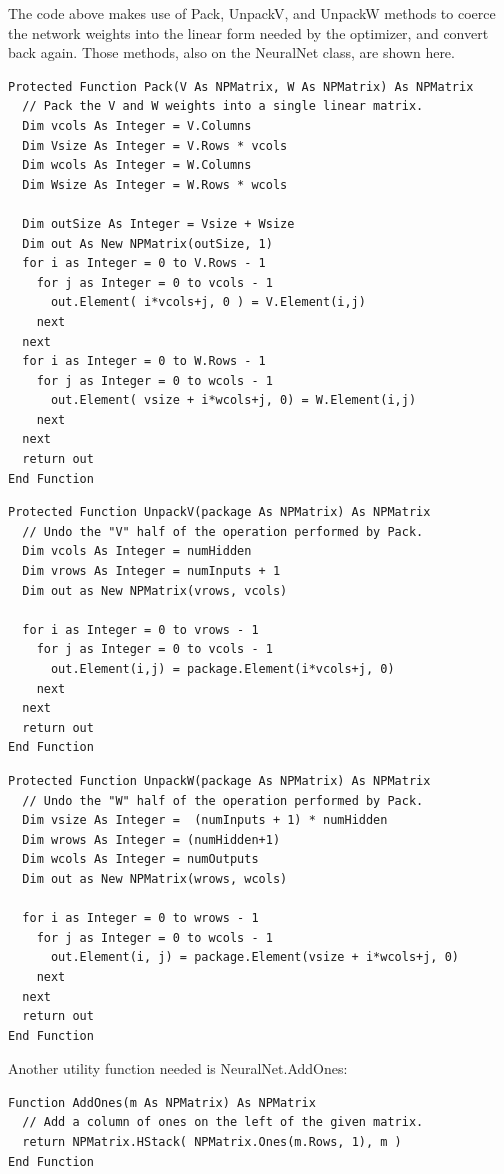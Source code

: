 \documentclass{article}
\begin{document}
The code above makes use of Pack, UnpackV, and UnpackW methods to coerce the network weights into the linear form needed by the optimizer, and convert back again.  Those methods, also on the NeuralNet class, are shown here.

\begin{lstlisting}
Protected Function Pack(V As NPMatrix, W As NPMatrix) As NPMatrix
  // Pack the V and W weights into a single linear matrix.
  Dim vcols As Integer = V.Columns
  Dim Vsize As Integer = V.Rows * vcols
  Dim wcols As Integer = W.Columns
  Dim Wsize As Integer = W.Rows * wcols
  
  Dim outSize As Integer = Vsize + Wsize
  Dim out As New NPMatrix(outSize, 1)
  for i as Integer = 0 to V.Rows - 1
    for j as Integer = 0 to vcols - 1
      out.Element( i*vcols+j, 0 ) = V.Element(i,j)
    next
  next
  for i as Integer = 0 to W.Rows - 1
    for j as Integer = 0 to wcols - 1
      out.Element( vsize + i*wcols+j, 0) = W.Element(i,j)
    next
  next
  return out
End Function
\end{lstlisting}

\begin{lstlisting}
Protected Function UnpackV(package As NPMatrix) As NPMatrix
  // Undo the "V" half of the operation performed by Pack.
  Dim vcols As Integer = numHidden
  Dim vrows As Integer = numInputs + 1
  Dim out as New NPMatrix(vrows, vcols)
  
  for i as Integer = 0 to vrows - 1
    for j as Integer = 0 to vcols - 1
      out.Element(i,j) = package.Element(i*vcols+j, 0)
    next
  next
  return out
End Function
\end{lstlisting}

\begin{lstlisting}
Protected Function UnpackW(package As NPMatrix) As NPMatrix
  // Undo the "W" half of the operation performed by Pack.
  Dim vsize As Integer =  (numInputs + 1) * numHidden
  Dim wrows As Integer = (numHidden+1)
  Dim wcols As Integer = numOutputs
  Dim out as New NPMatrix(wrows, wcols)
  
  for i as Integer = 0 to wrows - 1
    for j as Integer = 0 to wcols - 1
      out.Element(i, j) = package.Element(vsize + i*wcols+j, 0)
    next
  next
  return out
End Function
\end{lstlisting}

Another utility function needed is NeuralNet.AddOnes:

\begin{lstlisting}
Function AddOnes(m As NPMatrix) As NPMatrix
  // Add a column of ones on the left of the given matrix.
  return NPMatrix.HStack( NPMatrix.Ones(m.Rows, 1), m )
End Function
\end{lstlisting}
\end{document}
